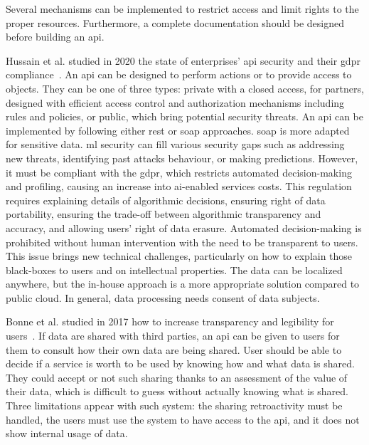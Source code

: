 Several mechanisms can be implemented to restrict access and limit rights to the proper resources. Furthermore, a complete documentation should be designed before building an \gls{api}.

Hussain et al. studied in 2020 the state of enterprises' \gls{api} security and their \gls{gdpr} compliance~\cite{hussain_enterprise_2020}. An \gls{api} can be designed to perform actions or to provide access to objects. They can be one of three types: private with a closed access, for partners, designed with efficient access control and authorization mechanisms including rules and policies, or public, which bring potential security threats. An \gls{api} can be implemented by following either \gls{rest} or \gls{soap} approaches. \gls{soap} is more adapted for sensitive data. \gls{ml} security can fill various security gaps such as addressing new threats, identifying past attacks behaviour, or making predictions. However, it must be compliant with the \gls{gdpr}, which restricts automated decision-making and profiling, causing an increase into \gls{ai}-enabled services costs. This regulation requires explaining details of algorithmic decisions, ensuring right of data portability, ensuring the trade-off between algorithmic transparency and accuracy, and allowing users' right of data erasure. Automated decision-making is prohibited without human intervention with the need to be transparent to users. This issue brings new technical challenges, particularly on how to explain those black-boxes to users and on intellectual properties. The data can be localized anywhere, but the in-house approach is a more appropriate solution compared to public \gls{cloud}. In general, data processing needs consent of data subjects. %

Bonne et al. studied in 2017 how to increase transparency and legibility for users~\cite{bonne_privacy_2017}. If data are shared with third parties, an \gls{api} can be given to users for them to consult how their own data are being shared. User should be able to decide if a service is worth to be used by knowing how and what data is shared. They could accept or not such sharing thanks to an assessment of the value of their data, which is difficult to guess without actually knowing what is shared. Three limitations appear with such system: the sharing retroactivity must be handled, the users must use the system to have access to the \gls{api}, and it does not show internal usage of data. %

